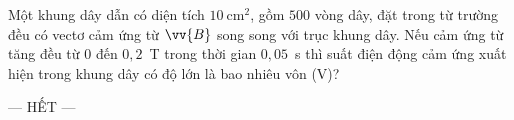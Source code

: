 	\begin{ex}%
		Một khung dây dẫn có diện tích $10~\text{cm}^2$, gồm $500$ vòng dây, đặt trong từ trường đều có vectơ cảm ứng từ $\vv{B}$ song song với trục khung dây. Nếu cảm ứng từ tăng đều từ $0$ đến $0{,}2$~T trong thời gian $0{,}05$~s thì suất điện động cảm ứng xuất hiện trong khung dây có độ lớn là bao nhiêu vôn (V)?
		\par
	\end{ex}

	\centerline{--- HẾT ---}



